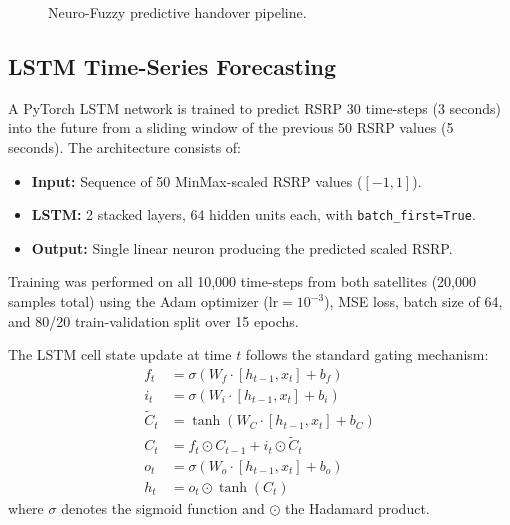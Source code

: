 \documentclass[conference]{IEEEtran}
\begin{document}
\begin{figure}[htbp]
\centering
{}
\caption{Neuro-Fuzzy predictive handover pipeline.}
\label{fig:architecture}
\end{figure}

\subsection{LSTM Time-Series Forecasting}

A PyTorch LSTM network is trained to predict RSRP 30 time-steps (3 seconds) into the future from a sliding window of the previous 50 RSRP values (5 seconds). The architecture consists of:
\begin{itemize}
    \item \textbf{Input:} Sequence of 50 MinMax-scaled RSRP values ($[-1, 1]$).
    \item \textbf{LSTM:} 2 stacked layers, 64 hidden units each, with \texttt{batch\_first=True}.
    \item \textbf{Output:} Single linear neuron producing the predicted scaled RSRP.
\end{itemize}

Training was performed on all 10,000 time-steps from both satellites (20,000 samples total) using the Adam optimizer ($\text{lr} = 10^{-3}$), MSE loss, batch size of 64, and 80/20 train-validation split over 15 epochs.

The LSTM cell state update at time $t$ follows the standard gating mechanism:
\begin{align}
f_t &= \sigma(W_f \cdot [h_{t-1}, x_t] + b_f) \label{eq:forget}\\
i_t &= \sigma(W_i \cdot [h_{t-1}, x_t] + b_i) \label{eq:input}\\
\tilde{C}_t &= \tanh(W_C \cdot [h_{t-1}, x_t] + b_C) \label{eq:candidate}\\
C_t &= f_t \odot C_{t-1} + i_t \odot \tilde{C}_t \label{eq:cell}\\
o_t &= \sigma(W_o \cdot [h_{t-1}, x_t] + b_o) \label{eq:output_gate}\\
h_t &= o_t \odot \tanh(C_t) \label{eq:hidden}
\end{align}
where $\sigma$ denotes the sigmoid function and $\odot$ the Hadamard product.
\end{document}
